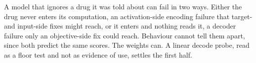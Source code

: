 %


\begin{question}[3]
A model that ignores a drug it was told about can fail in two ways. Either the
drug never enters its computation, an activation-side encoding failure that
target- and input-side fixes might reach, or it enters and nothing reads it, a
decoder failure only an objective-side fix could reach. Behaviour cannot tell
them apart, since both predict the same scores. The weights can. A linear decode
probe, read as a floor test and not as evidence of use, settles the first half.
\end{question}

